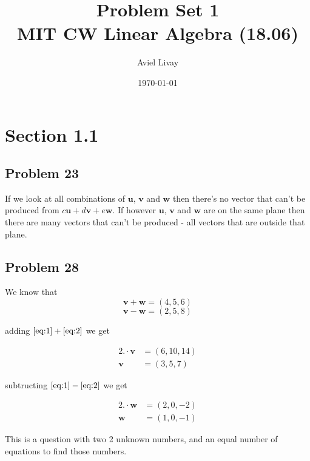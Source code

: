 \documentclass[a4paper,11pt]{article}
\title{%
	Problem Set 1\\
	\large MIT CW Linear Algebra (18.06)
}
\author{Aviel Livay}
\date{\today}
\newcommand{\mybf}[1]{\boldsymbol{#1}}
\begin{document}
\maketitle


\section*{Section 1.1}
\subsection*{Problem 23}
If we look at all combinations of $\mybf{u}$, $\mybf{v}$ and $\mybf{w}$ then there's no vector that can't be produced from $c\mybf{u}+d\mybf{v}+e\mybf{w}$. If however $\mybf{u}$, $\mybf{v}$ and $\mybf{w}$ are on the same plane then there are many vectors that can't be produced - all vectors that are outside that plane.

\subsection*{Problem 28}

We know that 
\begin{equation}
       \mybf{v}+\mybf{w} = (4,5,6)\label{eq:1}
\end{equation}
\begin{equation}
       \mybf{v}-\mybf{w} = (2,5,8)\label{eq:2}
\end{equation}

adding $\eqref{eq:1}+\eqref{eq:2}$ we get

\begin{subequations}

\begin{align}
    2.\cdot\mybf{v} &= (6,10,14)\label{eq:2v}\\
    \mybf{v} &= (3,5,7)\label{eq:v}
\end{align}
\end{subequations}

subtructing $\eqref{eq:1}-\eqref{eq:2}$ we get

\begin{subequations}
\begin{align}
    2.\cdot\mybf{w} &= (2,0,-2)\label{eq:2w}\\
    \mybf{w} &= (1,0,-1)\label{eq:w}
\end{align}
\end{subequations}


This is a question with two 2 unknown numbers, and an equal number of equations to find those numbers.
\end{document}
